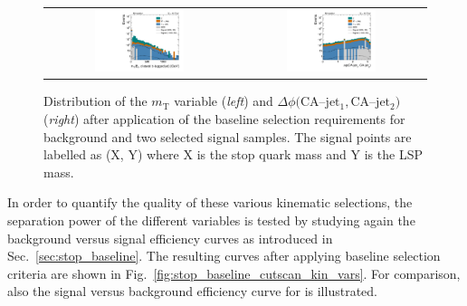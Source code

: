 \begin{figure}[!t]
  \centering
  \begin{tabular}{cc}
                \includegraphics[width=0.49\textwidth]{figures/Stop_DeltaPhiSelection_transverseMass_MET_closestAndBTaggedJet.pdf} &
                \includegraphics[width=0.49\textwidth]{figures/Stop_DeltaPhiSelection_deltaPhi_topjet1_topjet2.pdf}
  \end{tabular}
  \caption{Distribution of the $m_\mathrm{T}$ variable (\textit{left}) and $\Delta \phi(\mathrm{CA}$--$\mathrm{jet_1}, \mathrm{CA}$--$\mathrm{jet_2})$ (\textit{right}) after application of the baseline selection requirements for background and two selected signal samples. The signal points are labelled as (X, Y) where X is the stop quark mass and Y is the LSP mass.}
  \label{fig:stop_baseline_kin_vars2}
\end{figure}
In order to quantify the quality of these various kinematic selections, the separation power of the different variables is tested by studying again the background versus signal efficiency curves as introduced in Sec.~\ref{sec:stop_baseline}. The resulting curves after applying baseline selection criteria are shown in Fig.~\ref{fig:stop_baseline_cutscan_kin_vars}. For comparison, also the signal versus background efficiency curve for \met is illustrated. 
